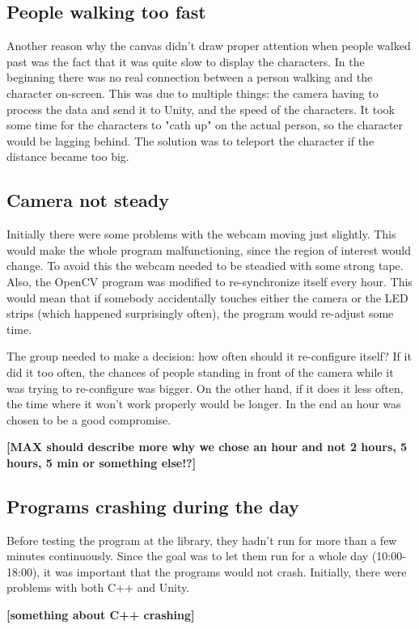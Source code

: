 \subsection{People walking too fast}
Another reason why the canvas didn't draw proper attention when people walked past was the fact that it was quite slow to display the characters. In the beginning there was no real connection between a person walking and the character on-screen. This was due to multiple things: the camera having to process the data and send it to Unity, and the speed of the characters. It took some time for the characters to "cath up" on the actual person, so the character would be lagging behind. The solution was to teleport the character if the distance became too big.

\subsection{Camera not steady}
Initially there were some problems with the webcam moving just slightly. This would make the whole program malfunctioning, since the region of interest would change. To avoid this the webcam needed to be steadied with some strong tape. Also, the OpenCV program was modified to re-synchronize itself every hour. This would mean that if somebody accidentally touches either the camera or the LED strips (which happened surprisingly often), the program would re-adjust some time.

The group needed to make a decision: how often should it re-configure itself? If it did it too often, the chances of people standing in front of the camera while it was trying to re-configure was bigger. On the other hand, if it does it less often, the time where it won't work properly would be longer. In the end an hour was chosen to be a good compromise.

\textbf{[MAX should describe more why we chose an hour and not 2 hours, 5 hours, 5 min or something else!?]}

\subsection{Programs crashing during the day}
Before testing the program at the library, they hadn't run for more than a few minutes continuously. Since the goal was to let them run for a whole day (10:00-18:00), it was important that the programs would not crash. Initially, there were problems with both C++ and Unity.

\textbf{[something about C++ crashing]}

